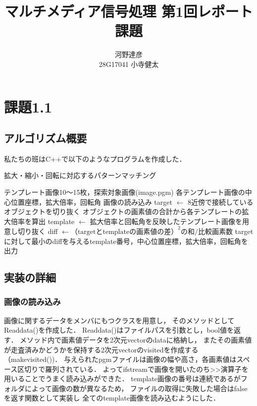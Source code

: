 \documentclass[uplatex,dvipdfmx]{jsarticle}
\title{マルチメディア信号処理 第1回レポート課題}
\author{河野達彦\\28G17041 小寺健太}
\begin{document}
  
\maketitle

\section{課題1.1}
\subsection{アルゴリズム概要}
私たちの班はC++で以下のようなプログラムを作成した．

\begin{algorithm}                      
\caption{拡大・縮小・回転に対応するパターンマッチング}         
\label{alg1}                          
\begin{algorithmic}                  
\REQUIRE テンプレート画像10〜15枚，探索対象画像(image.pgm)
\ENSURE 各テンプレート画像の中心位置座標，拡大倍率，回転角
\STATE 画像の読み込み
    \STATE target $\leftarrow$ 8近傍で接続しているオブジェクトを切り抜く
      \STATE オブジェクトの画素値の合計から各テンプレートの拡大倍率を算出
        \STATE template $\leftarrow$ 拡大倍率と回転角を反映したテンプレート画像を用意し切り抜く
        \STATE diff $\leftarrow （\mbox{target}と\mbox{template}の画素値の差）^2 の和 / 比較画素数$
      \ENDFOR
    \ENDFOR
    \STATE targetに対して最小のdiffを与えるtemplate番号，中心位置座標，拡大倍率，回転角を出力
  \ENDIF
\ENDFOR
\end{algorithmic}
\end{algorithm}

\subsection{実装の詳細}
\subsubsection{画像の読み込み}
画像に関するデータをメンバにもつクラスを用意し，
そのメソッドとしてReaddata()を作成した．
Readdata()はファイルパスを引数とし，bool値を返す．
メソッド内で画素値データを2次元vectorのdataに格納し，
またその画素値が走査済みかどうかを保持する2次元vectorのvisitedを作成する（makevisited())．
与えられたpgmファイルは画像の幅や高さ，各画素値はスペース区切りで羅列されている．
よってifstreamで画像を開いたのち>>演算子を用いることでうまく読み込みができた．
template画像の番号は連続であるがフォルダによって画像の数が異なるため，
ファイルの取得に失敗した場合はfalseを返す関数として実装し
全てのtemplate画像を読み込むようにした．\\
\end{document}
